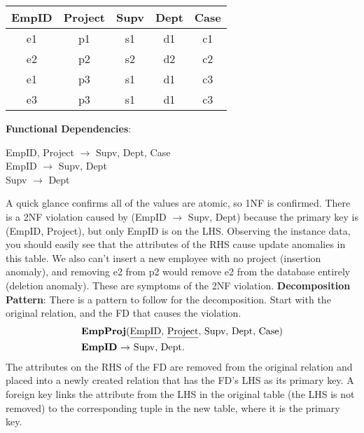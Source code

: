 \documentclass{report}
\begin{document}
\begin{itemize}
            \bigbreak \noindent 
            \begin{center}
            \begin{tabular}{|c|c|c|c|c|}
                \hline
                EmpID & Project & Supv & Dept & Case \\ \hline
                e1    & p1      & s1   & d1   & c1   \\ \hline
                e2    & p2      & s2   & d2   & c2   \\ \hline
                e1    & p3      & s1   & d1   & c3   \\ \hline
                e3    & p3      & s1   & d1   & c3   \\ \hline
            \end{tabular}
        \end{center}
        \bigbreak \noindent 
            \textbf{Functional Dependencies}:
            \begin{center}
                EmpID, Project $\to$ Supv, Dept, Case \\
                EmpID $\to$ Supv, Dept \\
                Supv $\to$ Dept
            \end{center}
            \bigbreak \noindent 
            A quick glance confirms all of the values are atomic, so 1NF is confirmed.
            \bigbreak \noindent 
            There is a 2NF violation caused by (EmpID $\to$ Supv, Dept) because the primary key is (EmpID, Project), but only EmpID is on the LHS.
            \bigbreak \noindent 
            Observing the instance data, you should easily see that the attributes of the RHS cause update anomalies in this
            table. We also can't insert a new employee with no project (insertion anomaly), and removing e2 from p2 would
            remove e2 from the database entirely (deletion anomaly). These are symptoms of the 2NF violation.
            \bigbreak \noindent 
            \textbf{Decomposition Pattern}: There is a pattern to follow for the decomposition. Start with the original relation, and the FD that causes the violation.
            \begin{align*}
                &\text{\textbf{EmpProj}(\underline{EmpID}, \underline{Project}, Supv, Dept, Case)} \\
                &\text{\textbf{EmpID} $\to$ Supv, Dept}
            .\end{align*}
            \bigbreak \noindent 
            The attributes on the RHS of the FD are removed from the original relation and placed into a newly created relation that has the FD's LHS as its primary key. A foreign key links the attribute from the LHS in the original table (the LHS is not removed) to the corresponding tuple in the new table, where it is the primary key.

\end{itemize}
\end{document}
